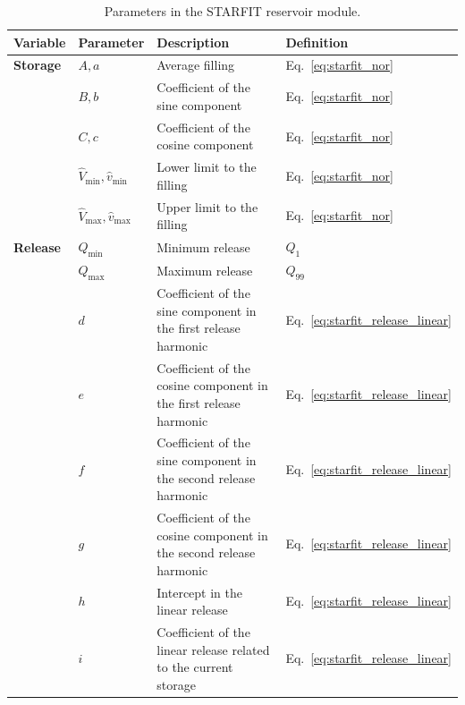 \documentclass[hess, manuscript]{copernicus}
\begin{document}
\begin{table}[t]
    \centering
    \begin{threeparttable}
        \caption{Parameters in the STARFIT reservoir module.}
        \label{tab:parameters_starfit}
        \begin{tabularx}{\textwidth}{llXl}
            \toprule
            \textbf{Variable} & \textbf{Parameter} & \textbf{Description} & \textbf{Definition} \\
            \midrule
            \textbf{Storage} & $A, a$\tnote{*} & Average filling & Eq.~\ref{eq:starfit_nor} \\
                             & $B, b$\tnote{*} & Coefficient of the sine component & Eq.~\ref{eq:starfit_nor} \\
                             & $C, c$\tnote{*} & Coefficient of the cosine component & Eq.~\ref{eq:starfit_nor} \\
                             & $\hat{V}_{\min}, \hat{v}_{\min}$\tnote{*} & Lower limit to the filling & Eq.~\ref{eq:starfit_nor} \\
                             & $\hat{V}_{\max}, \hat{v}_{\max}$\tnote{*} & Upper limit to the filling & Eq.~\ref{eq:starfit_nor} \\
            \midrule
            \textbf{Release} & $Q_{\min}$ & Minimum release & $Q_1$\tnote{**} \\
                             & $Q_{\max}$ & Maximum release & $Q_{99}$\tnote{**} \\
                             & $d$ & Coefficient of the sine component in the first release harmonic & Eq.~\ref{eq:starfit_release_linear} \\
                             & $e$ & Coefficient of the cosine component in the first release harmonic & Eq.~\ref{eq:starfit_release_linear} \\
                             & $f$ & Coefficient of the sine component in the second release harmonic & Eq.~\ref{eq:starfit_release_linear} \\
                             & $g$ & Coefficient of the cosine component in the second release harmonic & Eq.~\ref{eq:starfit_release_linear} \\
                             & $h$ & Intercept in the linear release & Eq.~\ref{eq:starfit_release_linear} \\
                             & $i$ & Coefficient of the linear release related to the current storage & Eq.~\ref{eq:starfit_release_linear} \\

\end{tabularx}
\end{threeparttable}
\end{table}
\end{document}
